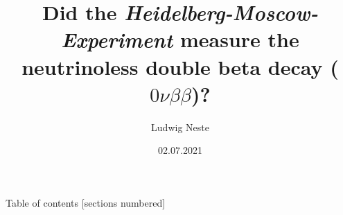 

\title{Did the \emph{Heidelberg-Moscow-Experiment} measure the neutrinoless double beta decay ($0\nu\beta\beta$)?}
\date{02.07.2021}
\author{Ludwig Neste}



\begin{frame}
	\titlepage
\end{frame}
\begin{frame}{Table of contents}
	[sections numbered]
	\tableofcontents[hideallsubsections]
\end{frame}







